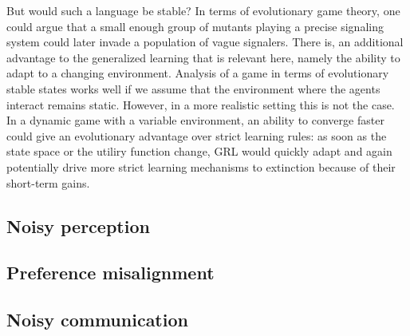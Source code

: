 \documentclass[a4paper]{article}
\begin{document}
But would such a language be stable?
In terms of evolutionary game theory, one could argue that a small enough group of mutants playing a precise signaling system could later invade a population of vague signalers.
There is, an additional advantage to the generalized learning that is relevant here, namely the ability to adapt to a changing environment.
Analysis of a game in terms of evolutionary stable states works well if we assume that the environment where the agents interact remains static.
However, in a more realistic setting this is not the case.
In a dynamic game with a variable environment, an ability to converge faster could give an evolutionary advantage over strict learning rules: as soon as the state space or the utiliry function change, GRL would quickly adapt and again potentially drive more strict learning mechanisms to extinction because of their short-term gains.


\subsection{Noisy perception}
\parencite{correia_bivalent_2013,franke_vagueness_2017}

\subsection{Preference misalignment}

\subsection{Noisy communication}


\printbibliography
\end{document}

